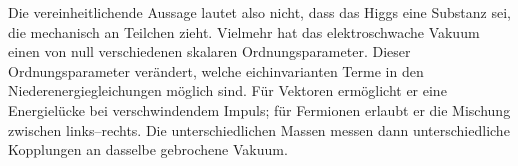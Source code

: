 Die vereinheitlichende Aussage lautet also nicht, dass das Higgs eine Substanz sei, die mechanisch an Teilchen zieht. Vielmehr hat das elektroschwache Vakuum einen von null verschiedenen skalaren Ordnungsparameter. Dieser Ordnungsparameter verändert, welche eichinvarianten Terme in den Niederenergiegleichungen möglich sind. Für Vektoren ermöglicht er eine Energielücke bei verschwindendem Impuls; für Fermionen erlaubt er die Mischung zwischen links--rechts. Die unterschiedlichen Massen messen dann unterschiedliche Kopplungen an dasselbe gebrochene Vakuum.
